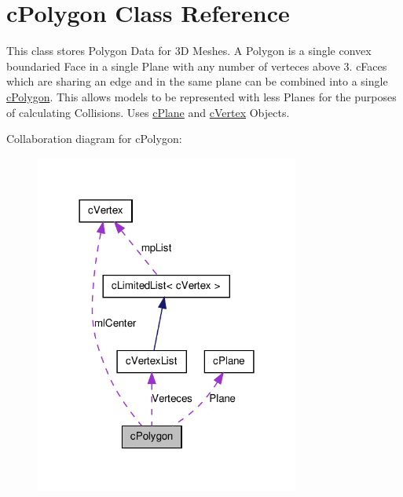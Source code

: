 \hypertarget{classc_polygon}{
\section{cPolygon Class Reference}
\label{classc_polygon}
}


This class stores Polygon Data for 3D Meshes. A Polygon is a single convex boundaried Face in a single Plane with any number of verteces above 3. cFaces which are sharing an edge and in the same plane can be combined into a single \hyperlink{classc_polygon}{cPolygon}. This allows models to be represented with less Planes for the purposes of calculating Collisions. Uses \hyperlink{classc_plane}{cPlane} and \hyperlink{classc_vertex}{cVertex} Objects.  




Collaboration diagram for cPolygon:
\nopagebreak
\begin{figure}[H]
\begin{center}
\leavevmode
\includegraphics[width=246pt]{classc_polygon__coll__graph}
\end{center}
\end{figure}
